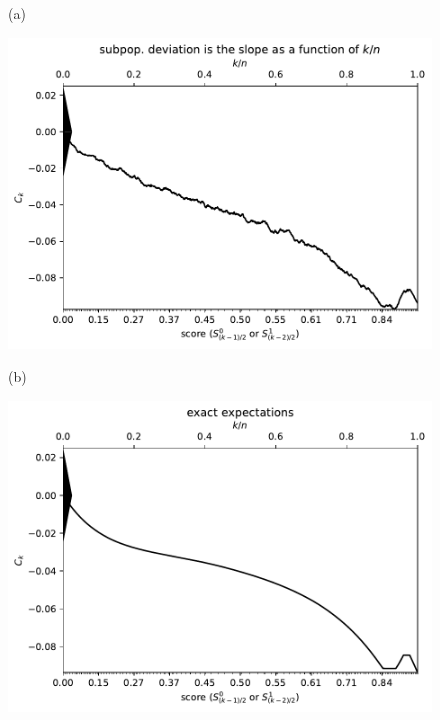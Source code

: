 \documentclass{article}
\newlength{\vertsep}
\newlength{\imsize}
\begin{document}
\begin{figure}
\begin{centering}

(a)
\parbox{\imsize}{\includegraphics[width=\imsize]
{../codes/unweighted/10000_7000_10_0/cumulative.pdf}}
\quad\quad
(b)
\parbox{\imsize}{\includegraphics[width=\imsize]
{../codes/unweighted/10000_7000_10_0/cumulative_exact.pdf}}

\vspace{\vertsep}


\end{centering}
\end{figure}
\end{document}
